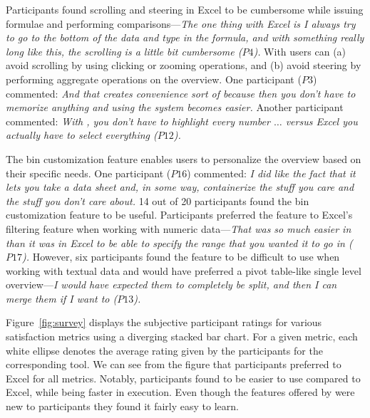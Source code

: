 Participants found scrolling and steering in Excel 
to be cumbersome while issuing formulae 
and performing comparisons---\emph{The one thing 
with Excel is I always try to go to the bottom of the data 
and type in the formula, and with something really long like this, 
the scrolling is a little bit cumbersome ($P4$).} 
With \noah users can 
(a) avoid scrolling by using clicking or zooming operations, 
and (b) avoid steering by performing aggregate operations on the overview. 
One participant ($P3$) commented: 
\emph{And that creates convenience sort of because then you don't have to memorize anything and using the system becomes easier.} 
Another participant commented: \emph{With \noah, 
you don't have to highlight every number $\ldots$ 
versus Excel you actually have to select everything ($P12$).} 

The bin customization feature enables users to 
personalize the overview based on their specific needs. 
One participant ($P16$) commented: 
\emph{I did like the fact that it lets you take a data sheet and, in some way, containerize the stuff you care and the stuff you don't care about.} 
14 out of 20 
participants found the bin customization feature to be useful. 
Participants preferred the feature to Excel’s filtering feature 
when working with numeric data---\emph{That was so much easier in \noah 
than it was in Excel to be able to specify the range that you wanted it to go in ($P17$).} However, six participants found the feature to be difficult 
to use when working with textual data and would have 
preferred a pivot table-like single level overview---\emph{I would have expected them to completely be split, 
and then I can merge them if I want to ($P13$).}

 Figure~\ref{fig:survey} displays the subjective participant ratings 
for various satisfaction metrics using a diverging stacked bar chart. 
For a given metric, each white ellipse denotes the average rating 
given by the participants for the corresponding tool. 
We can see from the figure that participants preferred \noah to Excel 
for all metrics. 
Notably, participants found \noah to be easier to use 
compared to Excel, while being faster in execution. 
Even though the features offered by \noah were new to participants 
they found it fairly easy to learn. 



